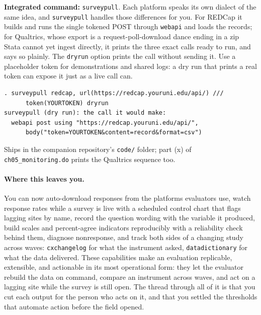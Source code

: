 \documentclass[
    a4paper,
    fontsize=10pt,
    twoside=true,
    numbers=noenddot,
]{kaobook}
\begin{document}
\begin{kaobox}[frametitle=Package Integration: \texttt{surveypull}]
\textbf{Integrated command:} \texttt{surveypull}. Each platform speaks its own dialect of the same idea, and \texttt{surveypull} handles those differences for you. For REDCap it builds and runs the single tokened POST through \texttt{webapi} and loads the records; for Qualtrics, whose export is a request-poll-download dance ending in a zip Stata cannot yet ingest directly, it prints the three exact calls ready to run, and says so plainly. The \texttt{dryrun} option prints the call without sending it. Use a placeholder token for demonstrations and shared logs: a dry run that prints a real token can expose it just as a live call can.
\par
{\footnotesize
\begin{verbatim}
. surveypull redcap, url(https://redcap.youruni.edu/api/) ///
      token(YOURTOKEN) dryrun
surveypull (dry run): the call it would make:
  webapi post using "https://redcap.youruni.edu/api/",
      body("token=YOURTOKEN&content=record&format=csv")
\end{verbatim}
}
Ships in the companion repository's \texttt{code/} folder; part (x) of \texttt{ch05\_monitoring.do} prints the Qualtrics sequence too.
\end{kaobox}

\paragraph{Where this leaves you.} You can now auto-download responses from the platforms evaluators use, watch response rates while a survey is live with a scheduled control chart that flags lagging sites by name, record the question wording with the variable it produced, build scales and percent-agree indicators reproducibly with a reliability check behind them, diagnose nonresponse, and track both sides of a changing study across waves: \texttt{cxchangelog} for what the instrument asked, \texttt{datadictionary} for what the data delivered. These capabilities make an evaluation replicable, extensible, and actionable in its most operational form: they let the evaluator rebuild the data on command, compare an instrument across waves, and act on a lagging site while the survey is still open. The thread through all of it is that you cut each output for the person who acts on it, and that you settled the thresholds that automate action before the field opened.
\end{document}
